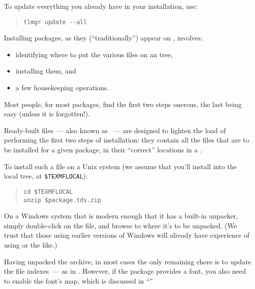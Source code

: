 To update everything you already have in your installation, use:
\begin{quote}
\begin{verbatim}
tlmgr update --all
\end{verbatim}
\end{quote}


Installing packages, as they (``traditionally'') appear on
, involves:
\begin{itemize}
\item identifying where to put the various files on an 
  tree,
\item installing them, and
\item a few housekeeping operations.
\end{itemize}
Most people, for most packages, find the first two steps onerous, the
last being easy (unless it is forgotten!).

Ready-built  files~--- also known as %
~--- are designed to lighten
the load of performing the first two steps of installation: they
contain all the files that are to be installed for a given
package, in their ``correct'' locations in a %
.

To install such a file on a Unix system (we assume that you'll install
into the local  tree, at \texttt{\$TEXMFLOCAL}):
\begin{quote}
\begin{verbatim}
cd $TEXMFLOCAL
unzip $package.tds.zip
\end{verbatim}
\end{quote}

On a Windows system that is modern enough that it has a built-in
 unpacker, simply double-click on the file, and browse to
where it's to be unpacked.  (We trust that those using earlier
versions of Windows will already have experience of using
 or the like.)

Having unpacked the  archive, in most cases the only
remaining chore is to update the file indexes~--- as in %
.  However, if
the package provides a font, you also need to enable the font's map,
which is discussed in %
``''

